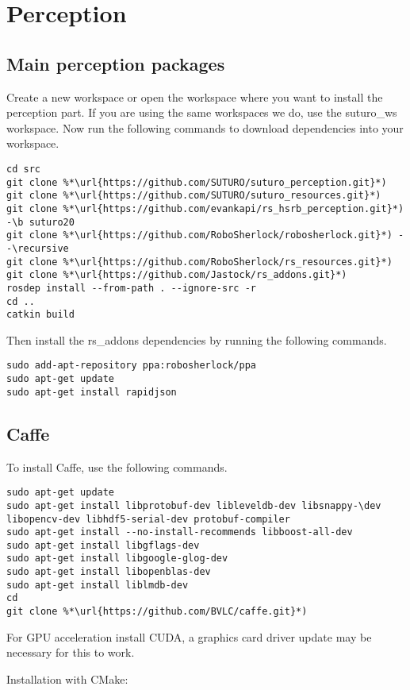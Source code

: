 \documentclass[main.tex]{subfiles}
\begin{document}
 \section{Perception}
 \subsection{Main perception packages}
 Create a new workspace or open the workspace where you want to install the perception part. If you are using the same workspaces we do, use the suturo\_ws workspace. Now run the following commands to download dependencies into your workspace.
 
 \begin{lstlisting}
cd src
git clone %*\url{https://github.com/SUTURO/suturo_perception.git}*)
git clone %*\url{https://github.com/SUTURO/suturo_resources.git}*) 
git clone %*\url{https://github.com/evankapi/rs_hsrb_perception.git}*) -\b suturo20
git clone %*\url{https://github.com/RoboSherlock/robosherlock.git}*) --\recursive
git clone %*\url{https://github.com/RoboSherlock/rs_resources.git}*)
git clone %*\url{https://github.com/Jastock/rs_addons.git}*)
rosdep install --from-path . --ignore-src -r 
cd ..
catkin build
\end{lstlisting}
 
 Then install the rs\_addons dependencies by running the following commands.
 \begin{lstlisting}
sudo add-apt-repository ppa:robosherlock/ppa
sudo apt-get update
sudo apt-get install rapidjson 
\end{lstlisting}
 
\subsection{Caffe}
To install Caffe, use the following commands.
 \begin{lstlisting}
sudo apt-get update
sudo apt-get install libprotobuf-dev libleveldb-dev libsnappy-\dev libopencv-dev libhdf5-serial-dev protobuf-compiler
sudo apt-get install --no-install-recommends libboost-all-dev
sudo apt-get install libgflags-dev
sudo apt-get install libgoogle-glog-dev
sudo apt-get install libopenblas-dev
sudo apt-get install liblmdb-dev
cd 
git clone %*\url{https://github.com/BVLC/caffe.git}*)
\end{lstlisting}
 
 For GPU acceleration install CUDA, a graphics card driver update may be necessary for this to work.
 
 Installation with CMake:\\
 
\end{document}
